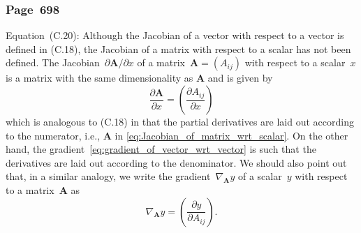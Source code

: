 \documentclass[12pt,a4paper]{article}
\newcommand{\erratum}[1]{\subsubsection*{#1}}
\begin{document}
\erratum{Page~698}
Equation~(C.20):
Although the Jacobian of a vector with respect to a vector is defined in (C.18),
the Jacobian of a matrix with respect to a scalar has not been defined.
The Jacobian~$\partial\mathbf{A}/\partial x$ of
a matrix~$\mathbf{A} = (A_{ij})$ with respect to a scalar~$x$ is
a matrix with the same dimensionality as $\mathbf{A}$
and is given by
\begin{equation}
\frac{\partial\mathbf{A}}{\partial x} = \left( \frac{\partial A_{ij}}{\partial x} \right)
\label{eq:Jacobian_of_matrix_wrt_scalar}
\end{equation}
which is analogous to (C.18) in that
the partial derivatives are laid out according to the numerator, i.e.,
$\mathbf{A}$ in \eqref{eq:Jacobian_of_matrix_wrt_scalar}.
On the other hand, the gradient~\eqref{eq:gradient_of_vector_wrt_vector} is such that
the derivatives are laid out according to the denominator.
We should also point out that,
in a similar analogy, we write the gradient~$\nabla_{\mathbf{A}} y$ of
a scalar~$y$ with respect to a matrix~$\mathbf{A}$ as
\begin{equation}
\nabla_{\mathbf{A}} y = \left( \frac{\partial y}{\partial A_{ij}} \right) .
\label{eq:gradient_of_scalar_wrt_matrix}
\end{equation}
\end{document}
